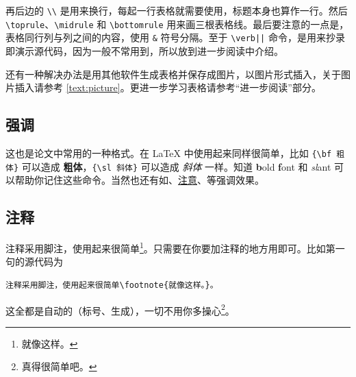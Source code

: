 再后边的 \verb|\\| 是用来换行，每起一行表格就需要使用，标题本身也算作一行。然后 \verb|\toprule|、\verb|\midrule| 和 \verb|\bottomrule| 用来画三根表格线。最后要注意的一点是，表格同行列与列之间的内容，使用 \verb|&| 符号分隔。至于 \verb+\verb||+ 命令，是用来抄录即演示源代码，因为一般不常用到，所以放到进一步阅读中介绍。

还有一种解决办法是用其他软件生成表格并保存成图片，以图片形式插入，关于图片插入请参考 \ref{text:picture}。更进一步学习表格请参考“进一步阅读”部分。

\subsection{强调}
这也是论文中常用的一种格式。在 LaTeX 中使用起来同样很简单，比如 \verb|{\bf 粗体}| 可以造成 {\bf 粗体}，\verb|{\sl 斜体}| 可以造成 {\sl 斜体} 一样。知道 {\bf b}old {\bf f}ont 和 {\sl sl}ant 可以帮助你记住这些命令。当然也还有如、\uline{注意}、等强调效果。

\subsection{注释}
注释采用脚注，使用起来很简单\footnote{就像这样。}。只需要在你要加注释的地方用即可。比如第一句的源代码为
\begin{Verbatim}[frame=single]
注释采用脚注，使用起来很简单\footnote{就像这样。}。
\end{Verbatim}
这全都是自动的（标号、生成），一切不用你多操心\footnote{真得很简单吧。}。


